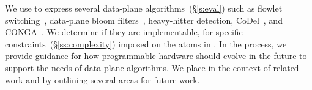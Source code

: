 We use \pktlanguage to express several data-plane algorithms~(\S\ref{s:eval})
such as flowlet switching~\cite{flowlets}, data-plane bloom
filters~\cite{bloom}, heavy-hitter detection, CoDel~\cite{codel}, and
CONGA~\cite{conga}. We determine if they are implementable, for specific
constraints~(\S\ref{ss:complexity}) imposed on the atoms in \absmachine. In the
process, we provide guidance for how programmable hardware should evolve in the
future to support the needs of data-plane algorithms.  We place \pktlanguage in
the context of related work and by outlining several areas for future work.
